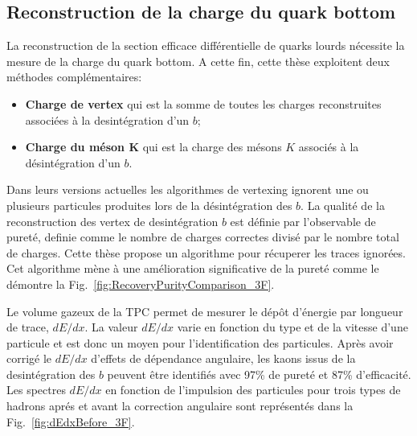 \subsection*{Reconstruction de la charge du quark bottom}
La reconstruction de la section efficace différentielle de quarks lourds nécessite la mesure de la charge du quark bottom.
A cette fin, cette thèse exploitent deux méthodes complémentaires:
\begin{itemize}
	\item \textbf{Charge de vertex} qui est la somme de toutes les charges reconstruites associées à la desintégration d'un $b$;
	\item \textbf{Charge du méson K} qui est la charge des mésons $K$ associés à la désintégration d'un $b$.
\end{itemize}

Dans leurs versions actuelles les algorithmes de vertexing ignorent une ou plusieurs particules produites lors de la désintégration des $b$. La qualité de la reconstruction des vertex de desintégration $b$ est définie par l'observable de pureté, definie comme le nombre de charges correctes divis\'e par le nombre total de charges.
Cette thèse propose un algorithme pour récuperer les traces ignorées. Cet algorithme mène à une amélioration significative de la pureté comme le démontre la Fig.~\ref{fig:RecoveryPurityComparison_3F}.%

Le volume gazeux de la TPC permet de mesurer le dépôt d'énergie par longueur de trace, $dE/dx$. La valeur  $dE/dx$ varie en fonction du type et de la vitesse d'une particule et est donc un moyen pour l'identification des particules.  Après avoir corrigé le $dE/dx$ d'effets de dépendance angulaire, les kaons issus de la desintégration des  $b$ peuvent être identifiés avec 97\% de pureté et 87\% d'efficacité.
Les spectres $dE/dx$ en fonction de l'impulsion des particules pour trois types de hadrons apr\'es et avant  la correction angulaire sont représentés dans la Fig.~\ref{fig:dEdxBefore_3F}.

